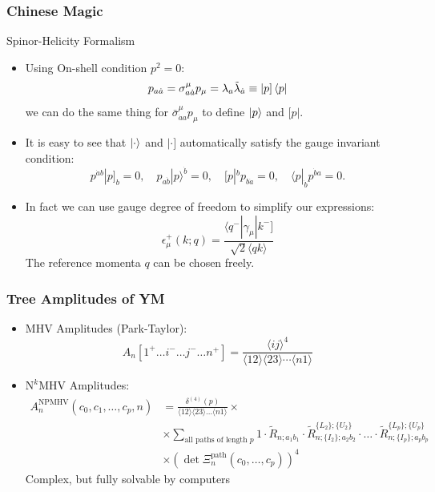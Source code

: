 \documentclass[aspectratio=169]{beamer}%
\begin{document}
	\begin{frame}
		\frametitle{Chinese Magic}
		Spinor-Helicity Formalism
		\begin{itemize}
			\item {Using On-shell condition $p^2=0$:
			$$	
		    p_{a\dot{a}}=\sigma^\mu_{a\dot{a}}p_\mu=\lambda_a\tilde\lambda_{\dot{a}}\equiv|p]\bra{p}
			$$
			we can do the same thing for $\bar \sigma^\mu_{\dot{a}a}p_\mu$ to define $\ket{p}$ and $[p|$.
			}
			
			\item {It is easy to see that $\ket{\cdot}$ and $|\cdot]$ automatically satisfy the gauge invariant condition:
				$$
				p^{\dot{a}b}|p]_b=0,\quad p_{a\dot{b}}|p\rangle^{\dot{b}}=0,\quad[p|^bp_{b\dot{a}}=0,\quad\langle p|_{\dot{b}}p^{\dot{b}a}=0.
				$$
			}
			
			\item {In fact we can use gauge degree of freedom to simplify our expressions:
				$$
				\epsilon_{\mu}^{+}(k;q)=\frac{\langle q^{-}|\gamma_{\mu}|k^{-}]}{\sqrt{2}\langle qk\rangle}
				$$
				The reference momenta $q$ can be chosen freely.
			}
		\end{itemize}
	\end{frame}
	
	\begin{frame}
		\frametitle{Tree Amplitudes of YM}
		\begin{itemize}
			\item {		
				MHV Amplitudes (Park-Taylor):
				$$
					A_n\left[1^+\ldots i^-\ldots j^-\ldots n^+\right]=\frac{\langle ij\rangle^4}{\langle12\rangle\langle23\rangle\cdots\langle n1\rangle}
				$$
		}
		\item{
			$\text{N}^k$MHV Amplitudes:
			$$
			\begin{aligned}A_n^{\mathrm{NPMHV}}(c_0,c_1,\ldots,c_p,n)&=\frac{\delta^{(4)}(p)}{\langle12\rangle\langle23\rangle\ldots\langle n1\rangle}\times\\&\times\sum_{\text{all paths of length }p}1\cdot\tilde{R}_{n;a_1b_1}\cdot\tilde{R}_{n;\{I_2\};a_2b_2}^{\{L_2\};\{U_2\}}\cdot\ldots\cdot\tilde{R}_{n;\{I_p\};a_pb_p}^{\{L_p\};\{U_p\}}\\
			&\times\left(\det\Xi_n^{\mathrm{path}}(c_0,\ldots,c_p)\right)^4\end{aligned}
			$$
			Complex, but fully solvable by computers
		}
		\end{itemize}
	\end{frame}
\end{document}
